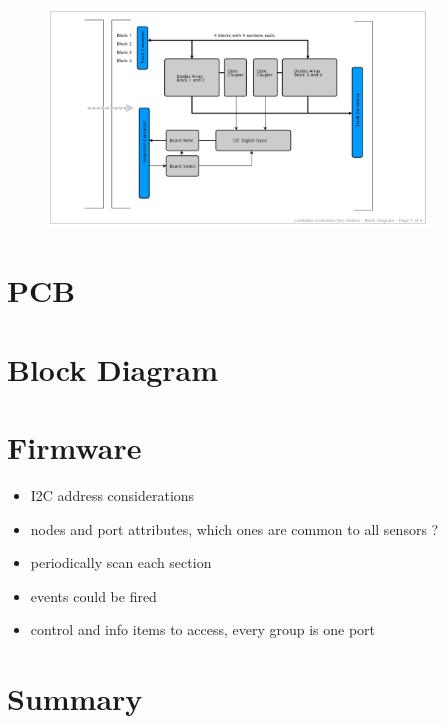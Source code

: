 \begin{figure}[htbp]
    \centering
    \includegraphics[page=4, width=0.9\textwidth]{./Schematics/Schematic_LcsNodes-Extension-4x4-Occ-Detect.pdf}
\end{figure}
\FloatBarrier

\section{PCB}

\section{Block Diagram}



\section{Firmware}

\begin{itemize}
\item I2C address considerations
\item nodes and port attributes, which ones are common to all sensors ?
\item periodically scan each section
\item events could be fired
\item control and info items to access, every group is one port
\end{itemize}

\section{Summary}

